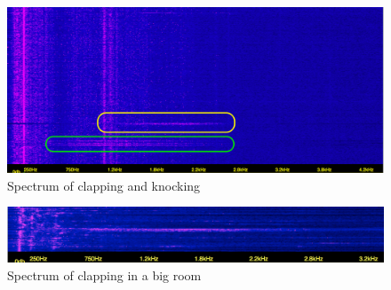 \newpage
\begin{figure}[h]
	\centering
	\includegraphics[width=\textwidth, trim={0 0 2cm 5cm},clip]{imgs/iSpectrumClappingKnocking}
	\caption{Spectrum of clapping and knocking}
	\label{fig:clappingKnocking}
\end{figure}
\begin{figure}[h]
	\centering
	\includegraphics[width=\textwidth]{imgs/iSpectrumClappingE2}
	\caption{Spectrum of clapping in a big room}
	\label{fig:clappingE2}
\end{figure}
